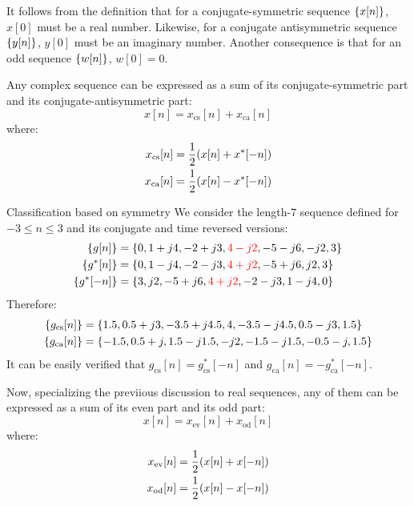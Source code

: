 \documentclass[../../main/main.tex]{subfiles}
\begin{document}
It follows from the definition that for a conjugate-symmetric sequence \( \qty{x[n]} \), \( x[0] \) must be a real number. Likewise, for a conjugate antisymmetric sequence \( \qty{y[n]} \), \( y[0] \) must be an imaginary number. Another consequence is that for an odd sequence \( \qty{w[n]} \), \( w[0] = 0 \).

Any complex sequence can be expressed as a sum of its conjugate-symmetric part and its conjugate-antisymmetric part:
\begin{equation}
    x[n]
    =
    x_{\mathrm{cs}}[n] + x_{\mathrm{ca}}[n]
    \label{eq:L02_S40_1}
\end{equation}
where:
\begin{align}
    x_{\mathrm{cs}}[n] &= \frac{1}{2} \qty(x[n] + x^{*}[-n])    \\
    x_{\mathrm{ca}}[n] &= \frac{1}{2} \qty(x[n] - x^{*}[-n])
\end{align}

\begin{example}{Classification based on symmetry}{}
    We consider the length-\( 7 \) sequence defined for \( -3 \le n \le 3 \) and its conjugate and time reversed versions:
    \begin{align}
        \qty{g[n]}
        &=
            \qty{0, 1+j4, -2+j3, {\color{red}4-j2}, -5-j6, -j2, 3}  \\
        \qty{g^{*}[n]}
        &=
            \qty{0, 1-j4, -2-j3, {\color{red}4+j2}, -5+j6,  j2, 3}  \\
        \qty{g^{*}[-n]}
        &=
            \qty{3, j2, -5+j6, {\color{red}4+j2}, -2-j3, 1-j4, 0}
    \end{align}
    Therefore:
    \begin{align}
        \qty{g_{\mathrm{cs}}[n]}
        &=
            \qty{1.5, 0.5+j3, -3.5+j4.5, 4, -3.5-j4.5, 0.5-j3, 1.5} \\
        \qty{g_{\mathrm{ca}}[n]}
        &=
            \qty{-1.5, 0.5+j, 1.5-j1.5, -j2, -1.5-j1.5, -0.5-j, 1.5}
    \end{align}
    It can be easily verified that \( g_{\mathrm{cs}}[n] = g_{\mathrm{cs}}^{*}[-n] \) and \( g_{\mathrm{ca}}[n] = - g_{\mathrm{ca}}^{*}[-n] \).
\end{example}

Now, specializing the previious discussion to real sequences, any of them can be expressed as a sum of its even part and its odd part:
\begin{equation}
    x[n]
    =
    x_{\mathrm{ev}}[n] + x_{\mathrm{od}}[n]
    \label{eq:L02_S43_1}
\end{equation}
where:
\begin{align}
    x_{\mathrm{ev}}[n] &= \frac{1}{2} \qty(x[n] + x[-n])    \\
    x_{\mathrm{od}}[n] &= \frac{1}{2} \qty(x[n] - x[-n])
\end{align}
\end{document}
